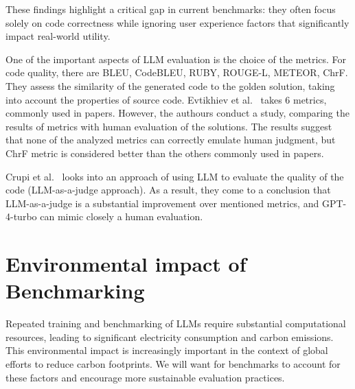 These findings highlight a critical gap in current benchmarks: they often focus solely on code correctness while ignoring user experience factors that significantly impact real-world utility.

One of the important aspects of LLM evaluation is the choice of the metrics.
For code quality, there are BLEU, CodeBLEU, RUBY, ROUGE-L, METEOR, ChrF\@.
They assess the similarity of the generated code to the golden solution, taking into account the properties of source code.
Evtikhiev et al.~\cite{evtikhiev2023out} takes 6 metrics, commonly used in papers.
However, the authours conduct a study, comparing the results of metrics with human evaluation of the solutions.
The results suggest that none of the analyzed metrics can correctly emulate human judgment, but ChrF metric is considered better than the others commonly used in papers.

Crupi et al.~\cite{crupi2025effectiveness} looks into an approach of using LLM to evaluate the quality of the code (LLM-as-a-judge approach).
As a result, they come to a conclusion that LLM-as-a-judge is a substantial improvement over mentioned metrics, and GPT-4-turbo can mimic closely a human evaluation.

\section{Environmental impact of Benchmarking}

Repeated training and benchmarking of LLMs require substantial computational resources, leading to significant electricity consumption and carbon emissions. This environmental impact is increasingly important in the context of global efforts to reduce carbon footprints. We will want for benchmarks to account for these factors and encourage more sustainable evaluation practices.



